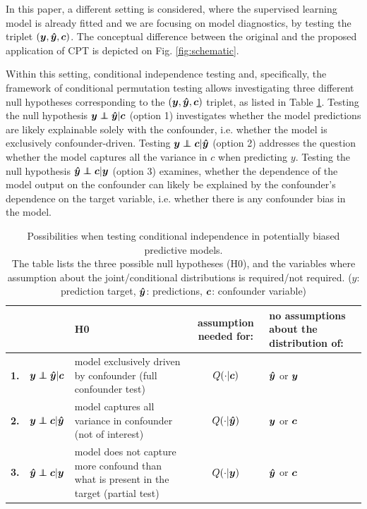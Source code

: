 \documentclass{article}
\begin{document}
In this paper, a different setting is considered, where the supervised learning model is already fitted and we are focusing on model diagnostics, by testing the triplet $(\boldsymbol{y},\boldsymbol{\hat{y}}, \boldsymbol{c})$. The conceptual difference between the original and the proposed application of CPT is depicted on Fig. \ref{fig:schematic}.

Within this setting, conditional independence testing and, specifically, the framework of conditional permutation testing allows investigating three different null hypotheses corresponding to the $(\boldsymbol{y}, \boldsymbol{\hat{y}}, \boldsymbol{c})$ triplet, as listed in Table \ref{tab:conditional-independence-cases}. Testing the null hypothesis $\y \independent \yhat | \c$ (option 1) investigates whether the model predictions are likely explainable solely with the confounder, i.e. whether the model is exclusively confounder-driven. Testing $\y \independent \c | \yhat$ (option 2) addresses the question whether the model captures all the variance in $c$ when predicting $y$. Testing the null hypothesis $\yhat \independent \c | \y$ (option 3) examines, whether the dependence of the model output on the confounder can likely be explained by the confounder's dependence on the target variable, i.e. whether there is any confounder bias in the model.

\renewcommand{\arraystretch}{1.2}
\begin{table}[]
\centering
\begin{tabular}{l|rp{60mm}|c|>{\centering\arraybackslash}m{30mm}}
 &  & H0  & assumption needed for: & no assumptions about the distribution of: \\
\hline
\textbf{1.} & $\y \independent \yhat | \c$ \quad  & model exclusively driven by confounder (full confounder test) & $Q(\cdot|\boldsymbol{c})$ & $\boldsymbol{\hat{y}}$ or $\boldsymbol{y}$ \\
\textbf{2.} & $\y \independent \c | \yhat$ \quad & model captures all variance in confounder (not of interest) & $Q(\cdot|\boldsymbol{\hat{y}})$ & $\boldsymbol{y}$ or $\boldsymbol{c}$ \\
\textbf{3.} & $\yhat \independent \c | \y$  \quad &  model does not capture more confound than what is present in the target (partial test) & $Q(\cdot|\boldsymbol{y})$ & $\boldsymbol{\hat{y}}$ or $\boldsymbol{c}$ \\
\end{tabular}
\caption{\label{tab:conditional-independence-cases} Possibilities when testing conditional independence in potentially biased predictive models. \\The table lists the three possible null hypotheses (H0), and the variables where assumption about the joint/conditional distributions is required/not required.   ($y$: prediction target, $\boldsymbol{\hat{y}}$: predictions, $\boldsymbol{c}$: confounder variable) }
\end{table}
\end{document}
